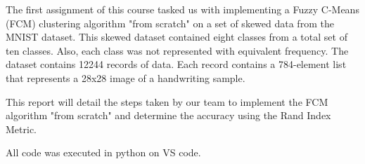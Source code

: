 The first assignment of this course tasked us with implementing a Fuzzy C-Means (FCM) clustering algorithm "from scratch" on a set of skewed data from the MNIST dataset. This skewed dataset contained eight classes from a total set of ten classes. Also, each class was not represented with equivalent frequency. The dataset contains 12244 records of data. Each record contains a 784-element list that represents a 28x28 image of a handwriting sample.

This report will detail the steps taken by our team to implement the FCM algorithm "from scratch" and determine the accuracy using the Rand Index Metric.

All code was executed in python on VS code.
